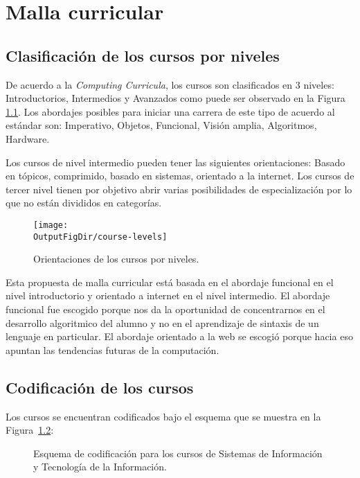 \chapter{Malla curricular}\label{chap:GeneralInfo}

\section{Clasificación de los cursos por niveles}
De acuerdo a la \textit{Computing Curricula}, los cursos son clasificados en 3 niveles: 
Introductorios, Intermedios y Avanzados como puede ser observado en la Figura \ref{fig:niveles}. 
Los abordajes posibles para iniciar una carrera de este tipo de acuerdo al estándar son: 
Imperativo, Objetos, Funcional, Visión amplia, Algoritmos, Hardware.
 
Los cursos de nivel intermedio pueden tener las siguientes orientaciones: 
Basado en tópicos, comprimido, basado en sistemas, orientado a la internet. 
Los cursos de tercer nivel tienen por objetivo abrir varias posibilidades de 
especialización por lo que no están divididos en categorí­as.

\begin{figure}[ht]
   \centering
   \texttt{[image: \\OutputFigDir/course-levels]}
   \caption{Orientaciones de los cursos por niveles.}
   \label{fig:niveles}
\end{figure}

Esta propuesta de malla curricular está basada en el abordaje funcional en el nivel introductorio y orientado 
a internet en el nivel intermedio. El abordaje funcional fue escogido porque nos da la oportunidad de 
concentrarnos en el desarrollo algoritmico del alumno y no en el aprendizaje de sintaxis de un lenguaje 
en particular. El abordaje orientado a la web se escogió porque hacia eso apuntan las 
tendencias futuras de la computación.

\section{Codificación de los cursos}
Los cursos se encuentran codificados bajo el esquema que se muestra en la Figura~\ref{fig:course-number}:
\begin{figure}[ht]
   \centering
   \caption{Esquema de codificación para los cursos de Sistemas de Información y Tecnologí­a de la Información.}
   \label{fig:course-number}
\end{figure}

